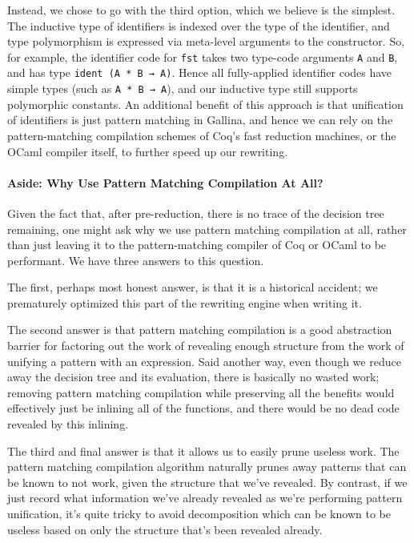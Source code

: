 Instead, we chose to go with the third option, which we believe is the simplest.
The inductive type of identifiers is indexed over the type of the identifier, and type polymorphism is expressed via meta-level arguments to the constructor.
So, for example, the identifier code for \texttt{fst} takes two type-code arguments \texttt{A} and \texttt{B}, and has type \texttt{ident (A * B → A)}.
Hence all fully-applied identifier codes have simple types (such as \texttt{A * B → A}), and our inductive type still supports polymorphic constants.
An additional benefit of this approach is that unification of identifiers is just pattern matching in Gallina, and hence we can rely on the pattern-matching compilation schemes of Coq's fast reduction machines, or the OCaml compiler itself, to further speed up our rewriting.

\paragraph{Aside: Why Use Pattern Matching Compilation At All?}
Given the fact that, after pre-reduction, there is no trace of the decision tree remaining, one might ask why we use pattern matching compilation at all, rather than just leaving it to the pattern-matching compiler of Coq or OCaml to be performant.
We have three answers to this question.

The first, perhaps most honest answer, is that it is a historical accident; we prematurely optimized this part of the rewriting engine when writing it.

The second answer is that pattern matching compilation is a good abstraction barrier for factoring out the work of revealing enough structure from the work of unifying a pattern with an expression.
Said another way, even though we reduce away the decision tree and its evaluation, there is basically no wasted work; removing pattern matching compilation while preserving all the benefits would effectively just be inlining all of the functions, and there would be no dead code revealed by this inlining.

The third and final answer is that it allows us to easily prune useless work.
The pattern matching compilation algorithm naturally prunes away patterns that can be known to not work, given the structure that we've revealed.
By contrast, if we just record what information we've already revealed as we're performing pattern unification, it's quite tricky to avoid decomposition which can be known to be useless based on only the structure that's been revealed already.

